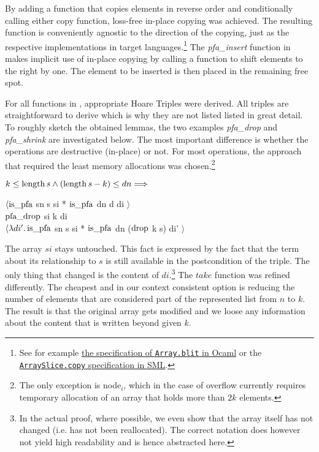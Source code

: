 By adding a function that copies elements in reverse order
and conditionally calling either copy function,
loss-free in-place copying was achieved.
The resulting function is conveniently agnostic to the direction
of the copying, just as the respective implementations
in target languages.\footnote{
    See for example \href{https://caml.inria.fr/pub/docs/manual-ocaml/libref/Array.html}{the specification of \texttt{Array.blit} in Ocaml} or
    the \href{https://smlfamily.github.io/Basis/array-slice.html\#SIG:ARRAY_SLICE.copy:VAL}{\texttt{ArraySlice.copy} specification in SML}.
}
The \textit{pfa\_insert} function in  makes
implicit use of in-place copying by calling a function to shift elements
to the right by one.
The element to be inserted is then placed in the remaining free spot.

For all functions in ,
appropriate Hoare Triples were derived.
All triples are straightforward to derive which is why they are not
listed listed in great detail.
To roughly sketch the obtained lemmas, the two examples
\textit{pfa\_drop} and \textit{pfa\_shrink} are investigated below.
The most important difference is whether
the operations are destructive (in-place) or not.
For most operations, the approach that required the least
memory allocations was chosen.\footnote{
    The only exception is node$_i$, which in the case of overflow
    currently requires temporary allocation of an array that holds more than $2k$ elements.
}

\begin{lemma}
    $k \le \operatorname{length} s \wedge (\operatorname{length} s - k) \le dn \Longrightarrow$ \\
    \begin{center}
    $\langle \operatorname{is\_pfa}$ sn s si * $\operatorname{is\_pfa}$ dn d di $\rangle$ \\
    $\operatorname{pfa\_drop}$ si k di \\
    $\langle\lambda di'. \operatorname{is\_pfa}$ sn s si * $\operatorname{is\_pfa}$ dn ($\operatorname{drop}$ k s) di' $\rangle$
    \end{center}
\end{lemma}

The array $si$ stays untouched.
This fact is expressed by the fact that the term about its relationship to $s$
is still available in the postcondition of the triple.
The only thing that changed is the content of $di$.\footnote{
    In the actual proof, where possible, we even show that the array itself has not changed
    (i.e. has not been reallocated).
    The correct notation does however not yield high readability
    and is hence abstracted here.
}
The $take$ function was refined differently.
The cheapest and in our context consistent option is
reducing the number of elements that are considered part of the represented list
from $n$ to $k$.
The result is that the original array gets modified and we loose any information
about the content that is written beyond given $k$.

